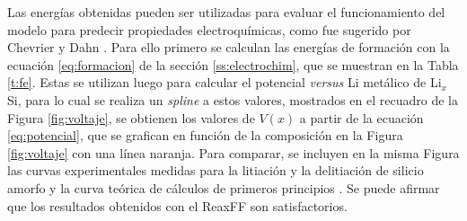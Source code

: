 Las energías obtenidas pueden ser utilizadas para evaluar el funcionamiento del 
modelo para predecir propiedades electroquímicas, como fue sugerido por Chevrier
y Dahn \cite{chevrier2009}. Para ello primero se calculan las energías de formación
con la ecuación \ref{eq:formacion} de la sección \ref{ss:electrochim}, que se muestran
en la Tabla \ref{t:fe}. Estas se utilizan luego para calcular el potencial 
\textit{versus} Li metálico de Li$_x$Si, para lo cual se realiza un \textit{spline} 
a estos valores, mostrados en el recuadro de la Figura \ref{fig:voltaje}, se obtienen
los valores de $V(x)$ a partir de la ecuación \ref{eq:potencial}, que se grafican en 
función de la composición en la Figura \ref{fig:voltaje} con una línea naranja. Para 
comparar, se incluyen en la misma Figura las curvas experimentales medidas para la
litiación y la delitiación de silicio amorfo \cite{hatchard2004} y la curva teórica 
de cálculos de primeros principios \cite{chevrier2009}. Se puede afirmar que los 
resultados obtenidos con el ReaxFF son satisfactorios.
\begin{table}[h!]
    \centering
    \caption{Energías de formación obtenidas a través de la ecuación \ref{eq:formacion}}
    \setlength\extrarowheight{2pt}
    \label{t:fe}
\end{table}
